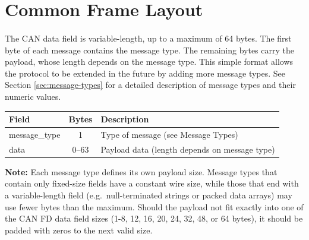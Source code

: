 \section{Common Frame Layout}\label{sec:frame-layout}
\paragraph{}
The CAN data field is variable-length, up to a maximum of 64 bytes.
The first byte of each message contains the message type.
The remaining bytes carry the payload, whose length depends on the message type.
This simple format allows the protocol to be extended in the future by adding more message types.
See Section \ref{sec:message-types} for a detailed description of message types and their numeric values.

\begin{center}
\begin{tabular}{l c l}
\toprule
Field & Bytes & Description \\
\midrule
message\_type & 1 & Type of message (see Message Types) \\
data & 0--63 & Payload data (length depends on message type) \\
\bottomrule
\end{tabular}
\end{center}

\textbf{Note:} Each message type defines its own payload size. Message types that
contain only fixed-size fields have a constant wire size, while those that end
with a variable-length field (e.g.\ null-terminated strings or packed data
arrays) may use fewer bytes than the maximum. Should the payload not fit exactly into
one of the CAN FD data field sizes (1-8, 12, 16, 20, 24, 32, 48, or 64 bytes),
it should be padded with zeros to the next valid size.